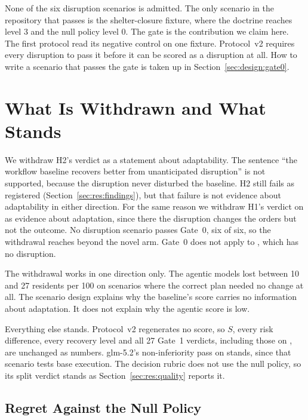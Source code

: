 None of the six disruption scenarios is admitted. The only scenario in the
repository that passes is the shelter-closure fixture, where the doctrine
reaches level 3 and the null policy level 0. The gate is the contribution we
claim here. The first protocol read its negative control on one fixture.
Protocol~v2 requires every disruption to pass it before it can be scored as a
disruption at all. How to write a scenario that passes the gate is taken up in
Section~\ref{sec:design:gate0}.

\section{What Is Withdrawn and What Stands}

We withdraw H2's verdict as a statement about adaptability. The sentence ``the
workflow baseline recovers better from unanticipated disruption'' is not
supported, because the disruption never disturbed the baseline. H2 still fails
as registered (Section~\ref{sec:res:findings}), but that failure is not
evidence about adaptability in either direction. For the same
reason we withdraw H1's verdict on  as evidence about
adaptation, since there the disruption changes the orders but not the outcome. No disruption scenario passes Gate~0,
six of six, so the withdrawal reaches beyond the novel arm. Gate~0 does not
apply to , which has no disruption.

The withdrawal works in one direction only. The agentic models lost between 10
and 27 residents per 100 on scenarios where the correct plan needed no change
at all. The scenario design explains why the baseline's score carries no
information about adaptation. It does not explain why the agentic score is
low.

Everything else stands. Protocol~v2 regenerates no score, so $S$, every risk
difference, every recovery level and all 27 Gate~1 verdicts, including those
on , are unchanged as numbers. glm-5.2's non-inferiority pass on  stands, since that
scenario tests base execution. The decision rubric does not use the null
policy, so its split verdict stands as Section~\ref{sec:res:quality} reports
it.

\subsection{Regret Against the Null Policy}
\label{sec:crit:regret}

